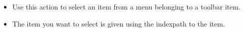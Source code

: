 
\begin{itemize}
\item Use this action to select an item from a menu belonging to a toolbar item. 
\item The item you want to select is given using the indexpath to the item.
\end{itemize}

